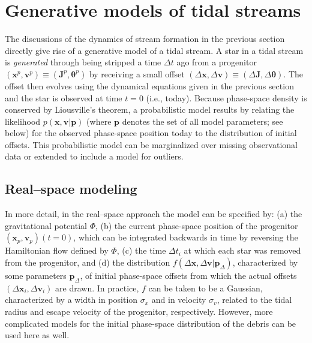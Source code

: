 \documentclass[12pt,preprint]{aastex}
\newcommand{\ie}{i.e.}
\renewcommand{\vec}[1]{\ensuremath{\mathbf{#1}}}
\newcommand{\vecx}{\ensuremath{\vec{x}}}
\newcommand{\vecv}{\ensuremath{\vec{v}}}
\newcommand{\vecj}{\ensuremath{\vec{J}}}
\newcommand{\vecp}{\ensuremath{\vec{p}}}
\newcommand{\veca}{\ensuremath{\boldsymbol\theta}}
\newcommand{\paramsdiff}{\ensuremath{\vec{p}_\Delta}}
\begin{document}
\section{Generative models of tidal streams}\label{sec:method}


The discussions of the dynamics of stream formation in the previous
section directly give rise of a generative model of a tidal stream. A
star in a tidal stream is \emph{generated} through being stripped a
time $\Delta t$ ago from a progenitor $(\vecx^p,\vecv^p) \equiv
(\vecj^p,\veca^p)$ by receiving a small offset $(\Delta \vecx,\Delta
\vecv) \equiv (\Delta \vecj,\Delta \veca)$. The offset then evolves
using the dynamical equations given in the previous section and the
star is observed at time $t=0$ (\ie, today). Because phase-space
density is conserved by Liousville's theorem, a probabilistic model
results by relating the likelihood $p(\vecx,\vecv|\vecp)$ (where
$\vecp$ denotes the set of all model parameters; see below) for the
observed phase-space position today to the distribution of initial
offsets. This probabilistic model can be marginalized over missing
observational data or extended to include a model for outliers.

\subsection{Real--space modeling}

In more detail, in the real--space approach the model can be specified
by: (a) the gravitational potential $\Phi$, (b) the current
phase-space position of the progenitor $(\vecx_p,\vecv_p)(t=0)$, which
can be integrated backwards in time by reversing the Hamiltonian flow
defined by $\Phi$, (c) the time $\Delta t_i$ at which each star was
removed from the progenitor, and (d) the distribution $f(\Delta
\vecx,\Delta \vecv|\paramsdiff)$, characterized by some parameters
$\paramsdiff$, of initial phase-space offsets from which the actual
offsets $(\Delta \vecx_i,\Delta \vecv_i)$ are drawn. In practice, $f$
can be taken to be a Gaussian, characterized by a width in position
$\sigma_x$ and in velocity $\sigma_v$, related to the tidal radius and
escape velocity of the progenitor, respectively. However, more
complicated models for the initial phase-space distribution of the
debris can be used here as well.
\end{document}
